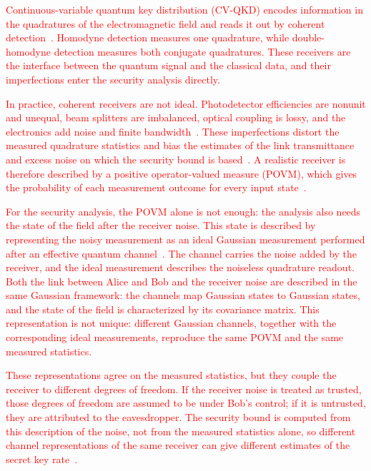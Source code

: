 \documentclass[%
final, 
superscriptaddress,
 amsmath,amssymb,amsfonts,
 aps,
 pra,
 longbibliography,
]{revtex4-2}
\begin{document}
\textcolor{red}{Continuous-variable quantum key distribution (CV-QKD) encodes information in the quadratures of the electromagnetic field and reads it out by coherent detection~\cite{Grosshans:prl:2002,Weed:rmp:2012,Pirandola:20,UsenkoRMP2026}. Homodyne detection measures one quadrature, while double-homodyne detection measures both conjugate quadratures. These receivers are the interface between the quantum signal and the classical data, and their imperfections enter the security analysis directly.}

\textcolor{red}{In practice, coherent receivers are not ideal. Photodetector efficiencies are nonunit and unequal, beam splitters are imbalanced, optical coupling is lossy, and the electronics add noise and finite bandwidth~\cite{Chi:njp:2011,Barchielli:pra:2022,Pan:pra:2025,qin2016quantum}. These imperfections distort the measured quadrature statistics and bias the estimates of the link transmittance and excess noise on which the security bound is based~\cite{Jouguet:pra:2012,Pereira:epjqt:2021,Lupo:prxq:2022,Mi2024BiasedDetection,hajomer2025finite,Bartlett:25}. A realistic receiver is therefore described by a positive operator-valued measure (POVM), which gives the probability of each measurement outcome for every input state~\cite{Ali1974,Ali2009,Serafini:bk:2023}.}

\textcolor{red}{For the security analysis, the POVM alone is not enough: the analysis also needs the state of the field after the receiver noise. This state is described by representing the noisy measurement as an ideal Gaussian measurement performed after an effective quantum channel~\cite{Serafini:bk:2023}. The channel carries the noise added by the receiver, and the ideal measurement describes the noiseless quadrature readout. Both the link between Alice and Bob and the receiver noise are described in the same Gaussian framework: the channels map Gaussian states to Gaussian states, and the state of the field is characterized by its covariance matrix. This representation is not unique: different Gaussian channels, together with the corresponding ideal measurements, reproduce the same POVM and the same measured statistics.}

\textcolor{red}{These representations agree on the measured statistics, but they couple the receiver to different degrees of freedom. If the receiver noise is treated as trusted, those degrees of freedom are assumed to be under Bob's control; if it is untrusted, they are attributed to the eavesdropper. The security bound is computed from this description of the noise, not from the measured statistics alone, so different channel representations of the same receiver can give different estimates of the secret key rate~\cite{HeidLutkenhaus2007,Lodewyck:pra:2007,Usenko:entropy:2016,Laudenbach:aqt:2019,Namiki2018DetectionChannel,PirandolaTrustLevels2021,Yamano2023GaussianTrustedNoise}.}
\end{document}
